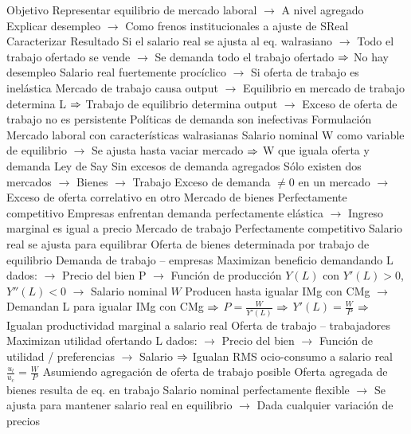 \documentclass{nuevotema}
\begin{document}
\begin{esquemal}
				\4 Objetivo
				\4[] Representar equilibrio de mercado laboral
				\4[] $\to$ A nivel agregado
				\4[] Explicar desempleo
				\4[] $\to$ Como frenos institucionales a ajuste de SReal
				\4[] Caracterizar
				\4 Resultado
				\4[] Si el salario real se ajusta al eq. walrasiano
				\4[] $\to$ Todo el trabajo ofertado se vende
				\4[] $\to$ Se demanda todo el trabajo ofertado
				\4[] $\then$ No hay desempleo
				\4[] Salario real fuertemente procíclico
				\4[] $\to$ Si oferta de trabajo es inelástica
				\4[] Mercado de trabajo causa output
				\4[] $\to$ Equilibrio en mercado de trabajo determina L
				\4[] $\then$ Trabajo de equilibrio determina output
				\4[] $\to$ Exceso de oferta de trabajo no es persistente
				\4[] Políticas de demanda son inefectivas
			\3 Formulación
				\4 Mercado laboral con características walrasianas
				\4[] Salario nominal W como variable de equilibrio
				\4[] $\to$ Se ajusta hasta vaciar mercado
				\4[] $\then$ W que iguala oferta y demanda
				\4 Ley de Say
				\4[] Sin excesos de demanda agregados
				\4[] Sólo existen dos mercados
				\4[] $\to$ Bienes
				\4[] $\to$ Trabajo
				\4[] Exceso de demanda $\neq 0$ en un mercado
				\4[] $\to$ Exceso de oferta correlativo en otro
				\4 Mercado de bienes
				\4[] Perfectamente competitivo
				\4[] Empresas enfrentan demanda perfectamente elástica
				\4[] $\to$ Ingreso marginal es igual a precio
				\4 Mercado de trabajo
				\4[] Perfectamente competitivo
				\4[] Salario real se ajusta para equilibrar
				\4[$\then$] Oferta de bienes determinada por trabajo de equilibrio
				\4 Demanda de trabajo -- empresas
				\4[] Maximizan beneficio demandando L dados:
				\4[] $\to$ Precio del bien P
				\4[] $\to$ Función de producción $Y(L)$ con $Y'(L)>0$, $Y''(L) <0$
				\4[] $\to$ Salario nominal $W$
				\4[] Producen hasta igualar IMg con CMg
				\4[] $\to$ Demandan L para igualar IMg con CMg
				\4[] $\then$ $P = \frac{W}{Y'(L)}$
				\4[] $\then$ $Y'(L) = \frac{W}{P}$
				\4[] $\then$ Igualan productividad marginal a salario real
				\4 Oferta de trabajo -- trabajadores
				\4[] Maximizan utilidad ofertando L dados:
				\4[] $\to$ Precio del bien
				\4[] $\to$ Función de utilidad / preferencias
				\4[] $\to$ Salario
				\4[] $\then$ Igualan RMS ocio-consumo a salario real
				\4[] $\frac{u_l}{u_c} = \frac{W}{P}$
				\4[] Asumiendo agregación de oferta de trabajo posible
				\4 Oferta agregada de bienes resulta de eq. en trabajo
				\4[] Salario nominal perfectamente flexible
				\4[] $\to$ Se ajusta para mantener salario real en equilibrio
				\4[] $\to$ Dada cualquier variación de precios

\end{esquemal}
\end{document}
